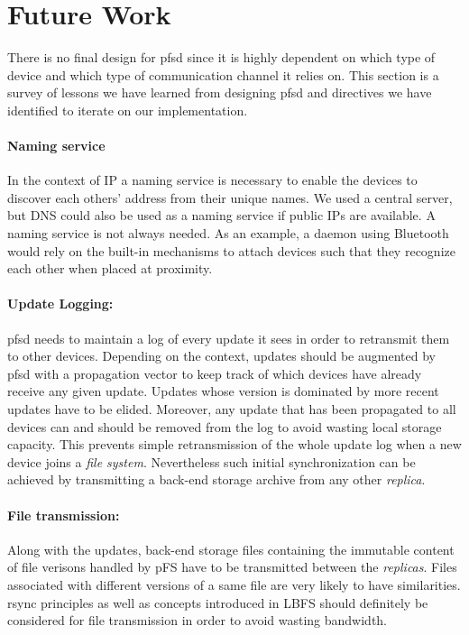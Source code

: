 
\section{Future Work}
\label{sec:futwk}

There is no final design for pfsd since it is highly dependent on
which type of device and which type of communication channel it relies
on. This section is a survey of lessons we have learned from designing
pfsd and directives we have identified to iterate on our implementation.

\paragraph {Naming service}
In the context of IP a naming service is necessary to enable the
devices to discover each others' address from their unique names. We
used a central server, but DNS could also be used as a naming service
if public IPs are available. A naming service is not always needed. As
an example, a daemon using Bluetooth would rely on the built-in
mechanisms to attach devices such that they recognize each other when
placed at proximity.

\paragraph {Update Logging:}
pfsd needs to maintain a log of every update it sees in order to
retransmit them to other devices. Depending on the context, updates
should be augmented by pfsd with a propagation vector to keep track of
which devices have already receive any given update. Updates whose
version is dominated by more recent updates have to be
elided. Moreover, any update that has been propagated to all devices
can and should be removed from the log to avoid wasting local storage
capacity. This prevents simple retransmission of the whole update
log when a new device joins a \emph{file system}. Nevertheless such
initial synchronization can be achieved by transmitting a back-end
storage archive from any other \emph{replica}.

\paragraph {File transmission:}
Along with the updates, back-end storage files containing the
immutable content of file verisons handled by pFS have to be
transmitted between the \emph{replicas}. Files associated with
different versions of a same file are very likely to have
similarities. rsync\cite{tridgell:rsync} principles as well as concepts
introduced in LBFS\cite{muthitacharoen:lbfs} should definitely be
considered for file transmission in order to avoid wasting bandwidth.

